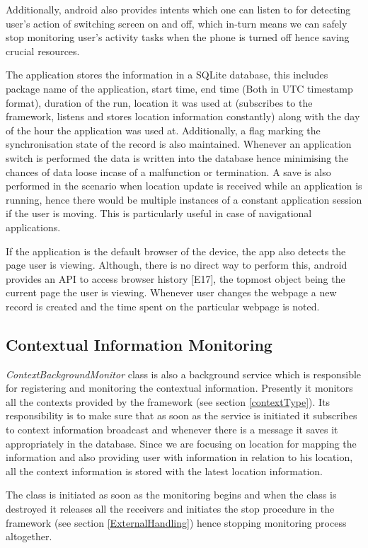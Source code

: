\documentclass[12pt]{report}
\begin{document}
Additionally, android also provides intents which one can listen to for detecting user's action of switching screen on and off, which in-turn means we can safely stop monitoring user's activity tasks when the phone is turned off hence saving crucial resources. 

The application stores the information in a SQLite database, this includes package name of the application, start time, end time (Both in UTC timestamp format), duration of the run, location it was used at (subscribes to the framework, listens and stores location information constantly) along with the day of the hour the application was used at. Additionally, a flag marking the synchronisation state of the record is also maintained. Whenever an application switch is performed the data is written into the database hence minimising the chances of data loose incase of a malfunction or termination. A save is also performed in the scenario when location update is received while an application is running, hence there would be multiple instances of a constant application session if the user is moving. This is particularly useful in case of navigational applications.

If the application is the default browser of the device, the app also detects the page user is viewing. Although, there is no direct way to perform this, android provides an API to access browser history [E17], the topmost object being the current page the user is viewing. Whenever user changes the webpage a new record is created and the time spent on the particular webpage is noted.

\subsection{Contextual Information Monitoring}
\textit{ContextBackgroundMonitor} class is also a background service which is responsible for registering and monitoring the contextual information. Presently it monitors all the contexts provided by the framework (see section \ref{contextType}). Its responsibility is to make sure that as soon as the service is initiated it subscribes to context information broadcast and whenever there is a message it saves it appropriately in the database. Since we are focusing on location for mapping the information and also providing user with information in relation to his location, all the context information is stored with the latest location information.

The class is initiated as soon as the monitoring begins and when the class is destroyed it releases all the receivers and initiates the stop procedure in the framework (see section \ref{ExternalHandling}) hence stopping monitoring process altogether.
\end{document}
